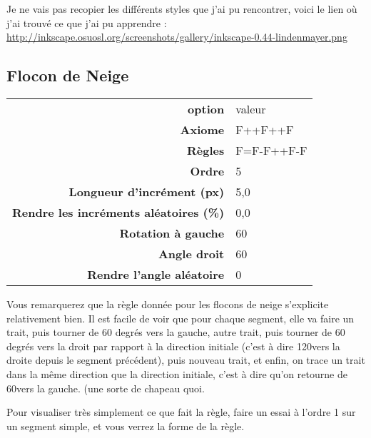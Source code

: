 \documentclass[a4paper,twoside]{article}
\begin{document}
Je ne vais pas recopier les différents styles que j'ai pu rencontrer, voici le lien où j'ai trouvé ce que j'ai pu apprendre :
\url{http://inkscape.osuosl.org/screenshots/gallery/inkscape-0.44-lindenmayer.png}

\subsection{Flocon de Neige}
\begin{tabular}{>{\bfseries}r<{}@{ : }p{6cm}}
option &	valeur\\
Axiome & F++F++F\\
Règles & F=F-F++F-F\\
Ordre & 5\\
Longueur d'incrément (px) & 5,0\\
Rendre les incréments aléatoires (\%) & 0,0\\
Rotation à gauche & 60\\
Angle droit & 60 \\
Rendre l'angle aléatoire & 0
\end{tabular}

\begin{remarque}
Vous remarquerez que la règle donnée pour les flocons de neige s'explicite relativement bien. Il est facile de voir que pour chaque segment, elle va faire un trait, puis tourner de 60 degrés vers la gauche, autre trait, puis tourner de 60 degrés vers la droit par rapport à la direction initiale (c'est à dire 120\degre vers la droite depuis le segment précédent), puis nouveau trait, et enfin, on trace un trait dans la même direction que la direction initiale, c'est à dire qu'on retourne de 60\degre vers la gauche. (une sorte de chapeau quoi.

Pour visualiser très simplement ce que fait la règle, faire un essai à l'ordre 1 sur un segment simple, et vous verrez la forme de la règle.
\end{remarque}



\printindex
\end{document}
